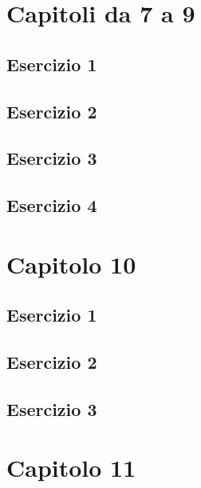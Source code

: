 \documentclass[a4paper,12pt,oneside]{book}
\begin{document}
\hypertarget{capitoli-da-7-a-9}{%
\section{Capitoli da 7 a 9}\label{capitoli-da-7-a-9}}

\hypertarget{esercizio-1-5}{%
\subsection{Esercizio 1}\label{esercizio-1-5}}

\hypertarget{esercizio-2-4}{%
\subsection{Esercizio 2}\label{esercizio-2-4}}

\hypertarget{esercizio-3-4}{%
\subsection{Esercizio 3}\label{esercizio-3-4}}

\hypertarget{esercizio-4-3}{%
\subsection{Esercizio 4}\label{esercizio-4-3}}

\hypertarget{capitolo-10}{%
\section{Capitolo 10}\label{capitolo-10}}

\hypertarget{esercizio-1-6}{%
\subsection{Esercizio 1}\label{esercizio-1-6}}

\hypertarget{esercizio-2-5}{%
\subsection{Esercizio 2}\label{esercizio-2-5}}

\hypertarget{esercizio-3-5}{%
\subsection{Esercizio 3}\label{esercizio-3-5}}

\hypertarget{capitolo-11}{%
\section{Capitolo 11}\label{capitolo-11}}
\end{document}
